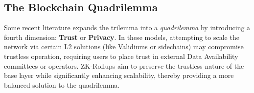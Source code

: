 \subsection{The Blockchain Quadrilemma}
Some recent literature expands the trilemma into a \textit{quadrilemma} by introducing a fourth dimension: \textbf{Trust} or \textbf{Privacy}. In these models, attempting to scale the network via certain L2 solutions (like Validiums or sidechains) may compromise trustless operation, requiring users to place trust in external Data Availability committees or operators. ZK-Rollups aim to preserve the trustless nature of the base layer while significantly enhancing scalability, thereby providing a more balanced solution to the quadrilemma.